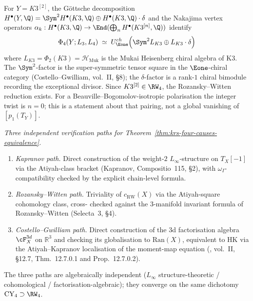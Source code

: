 \begin{remark}
\label{rem:phi-4-hilb2-k3-explicit}
%
For $Y = K3^{[2]}$, the G\"ottsche decomposition
$H^\bullet(Y, \Q) = \Sym^2 H^\bullet(K3, \Q) \oplus H^\bullet(K3, \Q) \cdot \delta$
and the Nakajima vertex operators $\alpha_k : H^\bullet(K3, \Q) \to
\End(\bigoplus_n H^\bullet(K3^{[n]}, \Q))$ identify
\[
 \Phi_4(Y;L_3,L_4) \;\simeq\; U^{ch}_{\Eone}\Bigl(\Sym^2 L_{K3} \oplus L_{K3} \cdot \delta\Bigr)
\]
where $L_{K3} = \Phi_2(K3) = \mathcal{H}_{\mathrm{Muk}}$ is the Mukai
Heisenberg chiral algebra of K$3$. The $\Sym^2$-factor is the
super-symmetric tensor square in the $\Eone$-chiral category
(Costello--Gwilliam, vol.\ II, \S 8); the $\delta$-factor is a
rank-$1$ chiral bimodule recording the exceptional divisor. Since
\(K3^{[2]}\in\RW_4\), the Rozansky--Witten reduction exists. For a
Beauville--Bogomolov-isotropic polarisation the integer twist is \(n=0\);
this is a statement about that pairing, not a global vanishing of
\([p_1(T_Y)]\).
\end{remark}

\noindent\emph{Three independent verification paths for
Theorem~\ref{thm:krs-four-causes-equivalence}.}
\begin{enumerate}[label=\textup{(}V\arabic*\textup{)}]
 \item \emph{Kapranov path.} Direct construction of the weight-$2$
 $L_\infty$-structure on $T_X[-1]$ via the Atiyah-class bracket
 (Kapranov, Compositio~115, \S 2), with $\omega_I$-compatibility
 checked by the explicit chain-level formula.
 \item \emph{Rozansky--Witten path.} Triviality of
 $c_{\mathrm{RW}}(X)$ via the Atiyah-square cohomology class, cross-
 checked against the 3-manifold invariant formula of Rozansky--Witten
 (Selecta~3, \S 4).
 \item \emph{Costello--Gwilliam path.} Direct construction of the 3d
 factorisation algebra $\cF^{3d}_X$ on $\mathbb{R}^3$ and checking its
 globalisation to $\mathrm{Ran}(X)$, equivalent to HK via the
 Atiyah--Kapranov localisation of the moment-map equation
 \textup{(}\cite{CostelloGwilliam}, vol.\ II, \S 12.7, Thm.\ 12.7.0.1
 and Prop.\ 12.7.0.2\textup{).}
\end{enumerate}
The three paths are algebraically independent \textup{(}$L_\infty$
structure-theoretic / cohomological / factorisation-algebraic\textup{);}
they converge on the same dichotomy $\mathrm{CY}_4 \supset \RW_4$.

